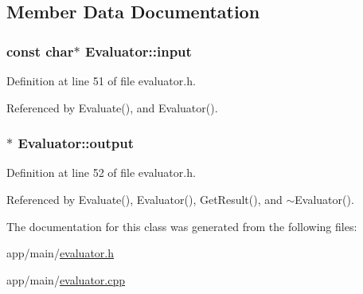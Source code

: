 \subsection{Member Data Documentation}
\subsubsection[{\texorpdfstring{input}{input}}]{\setlength{\rightskip}{0pt plus 5cm}const char$\ast$ Evaluator\+::input\hspace{0.3cm}{\ttfamily [private]}}\hypertarget{classEvaluator_a13bf216912227688690b87072bffcd59}{}\label{classEvaluator_a13bf216912227688690b87072bffcd59}


Definition at line 51 of file evaluator.\+h.



Referenced by Evaluate(), and Evaluator().

\subsubsection[{\texorpdfstring{output}{output}}]{$\ast$ Evaluator\+::output\hspace{0.3cm}{\ttfamily [private]}}\hypertarget{classEvaluator_a35018fd9dd13289a6dbf967cd1acd13c}{}\label{classEvaluator_a35018fd9dd13289a6dbf967cd1acd13c}


Definition at line 52 of file evaluator.\+h.



Referenced by Evaluate(), Evaluator(), Get\+Result(), and $\sim$\+Evaluator().



The documentation for this class was generated from the following files\+:\begin{DoxyCompactItemize}
\item 
app/main/\hyperlink{evaluator_8h}{evaluator.\+h}\item 
app/main/\hyperlink{evaluator_8cpp}{evaluator.\+cpp}\end{DoxyCompactItemize}
